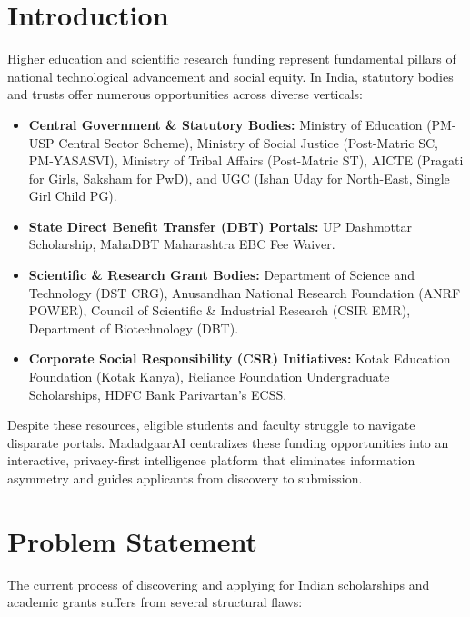 \documentclass[12pt,a4paper]{article}
\begin{document}
\section{Introduction}
Higher education and scientific research funding represent fundamental pillars of national technological advancement and social equity. In India, statutory bodies and trusts offer numerous opportunities across diverse verticals:
\begin{itemize}[itemsep=2pt]
    \item \textbf{Central Government \& Statutory Bodies:} Ministry of Education (PM-USP Central Sector Scheme), Ministry of Social Justice (Post-Matric SC, PM-YASASVI), Ministry of Tribal Affairs (Post-Matric ST), AICTE (Pragati for Girls, Saksham for PwD), and UGC (Ishan Uday for North-East, Single Girl Child PG).
    \item \textbf{State Direct Benefit Transfer (DBT) Portals:} UP Dashmottar Scholarship, MahaDBT Maharashtra EBC Fee Waiver.
    \item \textbf{Scientific \& Research Grant Bodies:} Department of Science and Technology (DST CRG), Anusandhan National Research Foundation (ANRF POWER), Council of Scientific \& Industrial Research (CSIR EMR), Department of Biotechnology (DBT).
    \item \textbf{Corporate Social Responsibility (CSR) Initiatives:} Kotak Education Foundation (Kotak Kanya), Reliance Foundation Undergraduate Scholarships, HDFC Bank Parivartan's ECSS.
\end{itemize}

Despite these resources, eligible students and faculty struggle to navigate disparate portals. MadadgaarAI centralizes these funding opportunities into an interactive, privacy-first intelligence platform that eliminates information asymmetry and guides applicants from discovery to submission.

\section{Problem Statement}
The current process of discovering and applying for Indian scholarships and academic grants suffers from several structural flaws:
\end{document}
